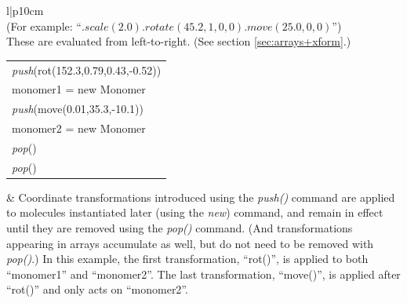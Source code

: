 \documentclass[11pt]{article}
\begin{document}
\begin{tabular}[h]{l|p{10cm}}
{}
\\
 {
(For example: \mbox{``$.scale(2.0).rotate(45.2,1,0,0).move(25.0,0,0)$''})
}
\\
 {
These are evaluated from left-to-right.
(See section \ref{sec:arrays+xform}.)
}
\\
\hline
\begin{tabular}[t]{l}
  \\
\textit{push}(rot(152.3,0.79,0.43,-0.52))  \\
monomer1 = new Monomer \\
\textit{push}(move(0.01,35.3,-10.1))  \\
monomer2 = new Monomer \\
\textit{pop}() \\
\textit{pop}() \\
\end{tabular}
&
Coordinate transformations introduced using the \textit{push()} command are applied to molecules instantiated later (using the \textit{new}) command, and remain in effect until they are removed using the \textit{pop()} command.  (And transformations appearing in arrays accumulate as well, but do not need to be removed with \textit{pop()}.)
In this example, the first transformation, ``rot()'', is applied to both ``monomer1'' and ``monomer2''.  The last transformation, ``move()'', is applied after ``rot()'' and only acts on ``monomer2''.
\\
\hline
\end{tabular}
\end{document}
